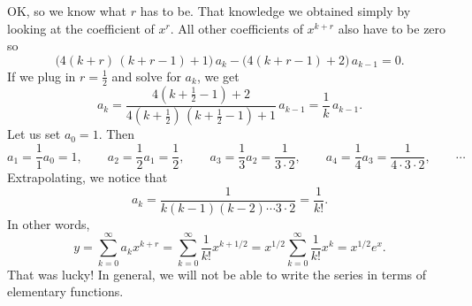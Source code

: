 \documentclass{ximera}
\begin{document}
\begin{exampleSol}
    OK\@, so we know what $r$ has to be.  That knowledge we obtained simply by looking at the coefficient of $x^r$.  All other coefficients of $x^{k+r}$ also have to be zero so
    \begin{equation*}
        \bigl( 4 (k+r)\,(k+r-1) + 1 \bigr) \, a_k - \bigl( 4 (k+r-1) + 2 \bigr) \, a_{k-1} = 0 .
    \end{equation*}
    If we plug in $r=\frac{1}{2}$ and solve for $a_k$, we get
    \begin{equation*}
        a_k = \frac{4 (k+\frac{1}{2}-1) + 2}{4 (k+\frac{1}{2})\,(k+\frac{1}{2}-1) + 1} \, a_{k-1} = \frac{1}{k} \, a_{k-1} .
    \end{equation*}
    Let us set $a_0 = 1$.  Then
    \begin{equation*}
        a_1 = \frac{1}{1} a_0 = 1 , \qquad a_2 = \frac{1}{2} a_1 = \frac{1}{2} , \qquad a_3 = \frac{1}{3} a_2 = \frac{1}{3 \cdot 2} , \qquad a_4 = \frac{1}{4} a_3 = \frac{1}{4 \cdot 3 \cdot 2} , \qquad \cdots
    \end{equation*}
    Extrapolating, we notice that
    \begin{equation*}
        a_k = \frac{1}{k(k-1)(k-2) \cdots 3 \cdot 2} = \frac{1}{k!} .
    \end{equation*}
    In other words,
    \begin{equation*}
        y =  \sum_{k=0}^\infty a_k x^{k+r} = \sum_{k=0}^\infty \frac{1}{k!} x^{k+1/2} = x^{1/2} \sum_{k=0}^\infty \frac{1}{k!} x^{k} = x^{1/2} e^x .
    \end{equation*}
    That was lucky!  In general, we will not be able to write the series in terms of elementary functions.
    

\end{exampleSol}
\end{document}
